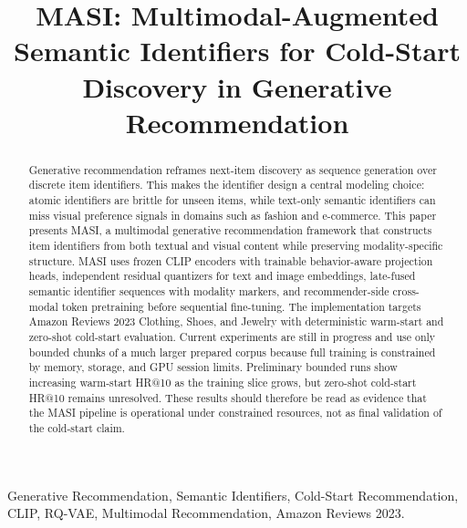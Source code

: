 \documentclass[conference]{IEEEtran}
\begin{document}
\title{MASI: Multimodal-Augmented Semantic Identifiers for Cold-Start Discovery in Generative Recommendation}

\author{
\and
{}
}

\maketitle

\begin{abstract}
Generative recommendation reframes next-item discovery as sequence generation over discrete item identifiers. This makes the identifier design a central modeling choice: atomic identifiers are brittle for unseen items, while text-only semantic identifiers can miss visual preference signals in domains such as fashion and e-commerce. This paper presents MASI, a multimodal generative recommendation framework that constructs item identifiers from both textual and visual content while preserving modality-specific structure. MASI uses frozen CLIP encoders with trainable behavior-aware projection heads, independent residual quantizers for text and image embeddings, late-fused semantic identifier sequences with modality markers, and recommender-side cross-modal token pretraining before sequential fine-tuning. The implementation targets Amazon Reviews 2023 Clothing, Shoes, and Jewelry with deterministic warm-start and zero-shot cold-start evaluation. Current experiments are still in progress and use only bounded chunks of a much larger prepared corpus because full training is constrained by memory, storage, and GPU session limits. Preliminary bounded runs show increasing warm-start HR@10 as the training slice grows, but zero-shot cold-start HR@10 remains unresolved. These results should therefore be read as evidence that the MASI pipeline is operational under constrained resources, not as final validation of the cold-start claim.
\end{abstract}

\begin{IEEEkeywords}
Generative Recommendation, Semantic Identifiers, Cold-Start Recommendation, CLIP, RQ-VAE, Multimodal Recommendation, Amazon Reviews 2023.
\end{IEEEkeywords}
\end{document}
